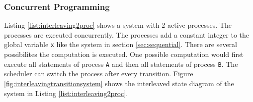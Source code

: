 \documentclass[a4paper, twoside]{article}
\begin{document}
\subsubsection{Concurrent Programming}
\label{sec:concurrent}

Listing \ref{list:interleaving2proc} shows a system with 2 active processes. The processes are executed concurrently. The processes add a constant integer to the global variable \verb|x| like the system in section \ref{sec:sequential}. There are several possibilites the computation is executed. One possible computation would first execute all statements of process \verb|A| and then all statements of process \verb|B|. The scheduler can switch the process after every transition. Figure \ref{fig:interleavingtransitionsystem} shows the interleaved state diagram of the system in Listing \ref{list:interleaving2proc}.

    
\end{document}

